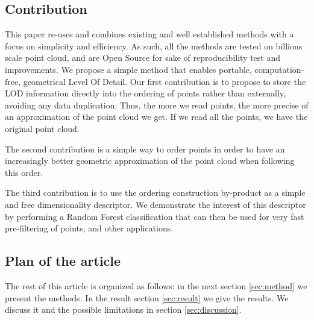 	
	\subsection{Contribution}
		This paper re-uses and combines existing and well established methods with a focus on simplicity and efficiency. As such, all the methods are tested on billions scale point cloud, and are Open Source for sake of reproducibility test and improvements.
		We propose a simple method that enables portable, computation-free, geometrical Level Of Detail.
		Our first contribution is to propose to store the LOD information directly into the ordering of points rather than externally, avoiding any data duplication.
		Thus, the more we read points, the more precise of an approximation of the point cloud we get. If we read all the points, we have the original point cloud.
		
		The second contribution is a simple way to order points in order to have an increasingly better geometric approximation of the point cloud when following this order.
		
		The third contribution is to use the ordering construction by-product as a simple and free dimensionality descriptor. We demonstrate the interest of this descriptor by performing a Random Forest classification that can then be used for very fast pre-filtering of points, and other applications.
			
		
	\subsection{Plan of the article}
		The rest of this article is organized as follows:
		in the next section \ref{sec:method} we present the methods.  
		In the result section \ref{sec:result} we give the results.
		We discuss it and the possible limitations in section \ref{sec:discussion}. 
